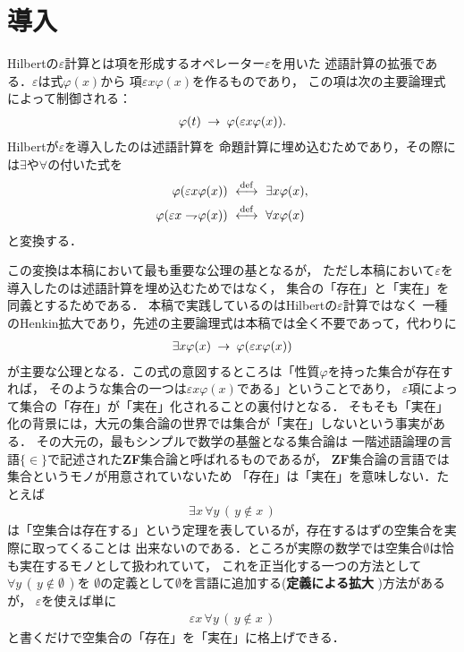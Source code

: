 \section{導入}
	Hilbertの$\varepsilon$計算とは項を形成するオペレーター$\varepsilon$を用いた
	述語計算の拡張である．$\varepsilon$は式$\varphi(x)$から
	項$\varepsilon x \varphi(x)$を作るものであり，
	この項は次の主要論理式によって制御される：
	\begin{align}
		\varphi(t) \hspace{0.25em}\rightarrow\hspace{0.25em} \varphi(\varepsilon x \varphi(x)).
	\end{align}
	Hilbertが$\varepsilon$を導入したのは述語計算を
	命題計算に埋め込むためであり，その際には$\exists$や$\forall$の付いた式を
	\begin{align}
		\varphi(\varepsilon x \varphi(x)) &\ \overset{\mathrm{def}}{\longleftrightarrow}\  \exists x \varphi(x), \\
		\varphi(\varepsilon x \rightharpoondown\hspace{-0.25em} \varphi(x)) &\ \overset{\mathrm{def}}{\longleftrightarrow}\  \forall x \varphi(x)
	\end{align}
	と変換する．
	
	この変換は本稿において最も重要な公理の基となるが，
	ただし本稿において$\varepsilon$を導入したのは述語計算を埋め込むためではなく，
	集合の「存在」と「実在」を同義とするためである．
	本稿で実践しているのはHilbertの$\varepsilon$計算ではなく
	一種のHenkin拡大であり，先述の主要論理式は本稿では全く不要であって，代わりに
	\begin{align}
		\exists x \varphi(x) \hspace{0.25em}\rightarrow\hspace{0.25em} \varphi(\varepsilon x \varphi(x))
	\end{align}
	が主要な公理となる．この式の意図するところは「性質$\varphi$を持った集合が存在すれば，
	そのような集合の一つは$\varepsilon x \varphi(x)$である」ということであり，
	$\varepsilon$項によって集合の「存在」が「実在」化されることの裏付けとなる．
	そもそも「実在」化の背景には，大元の集合論の世界では集合が「実在」しないという事実がある．
	その大元の，最もシンプルで数学の基盤となる集合論は
	一階述語論理の言語$\{\in\}$で記述された{\bf ZF}集合論と呼ばれるものであるが，
	{\bf ZF}集合論の言語では集合というモノが用意されていないため
	「存在」は「実在」を意味しない．たとえば
	\begin{align}
		\exists x\, \forall y\, (\, y \notin x\, )
	\end{align}
	は「空集合は存在する」という定理を表しているが，存在するはずの空集合を実際に取ってくることは
	出来ないのである．ところが実際の数学では空集合$\emptyset$は恰も実在するモノとして扱われていて，
	これを正当化する一つの方法として$\forall y\, (\, y \notin \emptyset\, )$を
	$\emptyset$の定義として$\emptyset$を言語に追加する({\bf 定義による拡大}
	)方法があるが，
	$\varepsilon$を使えば単に
	\begin{align}
		\varepsilon x\, \forall y\, (\, y \notin x\, )
	\end{align}
	と書くだけで空集合の「存在」を「実在」に格上げできる．
	

